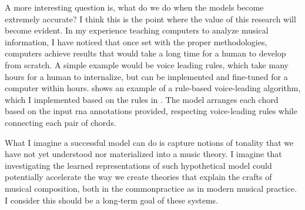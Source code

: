 

A more interesting question is, what do we do when the
models become extremely accurate? I think this is the point
where the value of this research will become evident. In my
experience teaching computers to analyze musical
information, I have noticed that once set with the proper
methodologies, computers achieve results that would take a
long time for a human to develop from scratch. A simple
example would be voice leading rules, which take many hours
for a human to internalize, but can be implemented and
fine-tuned for a computer within hours.
 shows an example of a
rule-based voice-leading algorithm, which I implemented
based on the rules in
\textcite{huron2016voice}.
The model arranges each chord based on the input \gls{rna}
annotations provided, respecting voice-leading rules while
connecting each pair of chords. 


What I imagine a successful model can do is capture notions
of tonality that we have not yet understood nor materialized
into a music theory. I imagine that investigating the
learned representations of such hypothetical model could
potentially accelerate the way we create theories that
explain the crafts of musical composition, both in the
\gls{commonpractice} as in modern musical practice. I
consider this should be a long-term goal of these systems.
